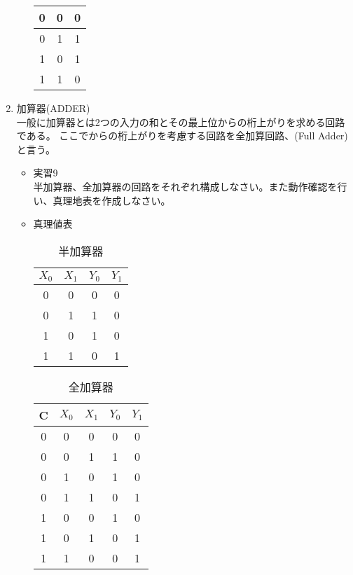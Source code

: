 \documentclass[dvipdfmx]{jsarticle}
\begin{document}
\begin{enumerate}
\begin{itemize}
\begin{table}[H]
\begin{tabular}{|c|c|c|}
											0 & 0 & 0\\ \hline
											0 & 1 & 1\\ \hline
											1 & 0 & 1\\ \hline
											1 & 1 & 0\\ \hline
										\end{tabular}
									\end{table}
							\end{itemize}
						\item 加算器(ADDER) \\
							一般に加算器とは2つの入力の和とその最上位からの桁上がりを求める回路である。
							ここでからの桁上がりを考慮する回路を全加算回路、(Full Adder)と言う。
							\begin{itemize}
								\item 実習9\\
								半加算器、全加算器の回路をそれぞれ構成しなさい。また動作確認を行い、真理地表を作成しなさい。
								\item 真理値表
									\begin{table}[H]
										\center
										\caption{半加算器\label{tb:half-adder}}
										\begin{tabular}{|c|c|c|c|}
											\hline
											$X_0$ & $X_1$ & $Y_0$ &$Y_1$ \\ \hline
											0 & 0 & 0 & 0 \\ \hline
											0 & 1 & 1 & 0\\ \hline
											1 & 0 & 1 & 0\\ \hline
											1 & 1 & 0 & 1\\ \hline
										\end{tabular}
									\end{table}
									\begin{table}[H]
										\center
										\caption{全加算器\label{tb:full-adder}}
										\begin{tabular}{|c|c|c|c|c|}
											\hline
											C & $X_0$ & $X_1$ & $Y_0$ &$Y_1$ \\ \hline
											0 & 0 & 0 & 0 & 0 \\ \hline
											0 & 0 & 1 & 1 & 0\\ \hline
											0 & 1 & 0 & 1 & 0\\ \hline
											0 & 1 & 1 & 0 & 1\\ \hline
											1 & 0 & 0 & 1 & 0 \\ \hline
											1 & 0 & 1 & 0 & 1\\ \hline
											1 & 1 & 0 & 0 & 1\\ \hline

\end{tabular}
\end{table}
\end{itemize}
\end{enumerate}
\end{document}
